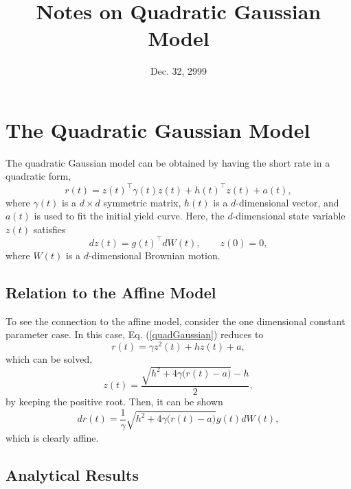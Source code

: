 \documentclass[12pt]{article}
\begin{document}
\title{Notes on Quadratic Gaussian Model}
\date{Dec. 32, 2999}

\maketitle


\section{The Quadratic Gaussian Model}

  The quadratic Gaussian model can be obtained by having the short rate in a quadratic form,
  \begin{equation}
    r(t)=z(t)^{\top}\gamma(t)z(t)+h(t)^{\top}z(t)+a(t),
    \label{quadGaussian}
  \end{equation}
  where $\gamma(t)$ is a $d\times d$ symmetric matrix, $h(t)$ is a $d$-dimensional vector, and $a(t)$ is
  used to fit the initial yield curve. Here, the $d$-dimensional state variable $z(t)$ satisfies
  \begin{equation}
    dz(t)=g(t)^{\top}dW(t), \quad \quad z(0)=0,
  \end{equation}
  where $W(t)$ is a $d$-dimensional Brownian motion.

  \subsection{Relation to the Affine Model}

  To see the connection to the affine model, consider the one dimensional constant parameter case.
  In this case, Eq. (\ref{quadGaussian}) reduces to
  \begin{equation}
    r(t)=\gamma z^2(t)+hz(t)+a,
  \end{equation}
  which can be solved,
  \begin{equation}
    z(t)=\frac{\sqrt{h^2+4\gamma\big(r(t)-a\big)}-h}{2},
  \end{equation}
  by keeping the positive root. Then, it can be shown
  \begin{equation}
    dr(t)=\frac{1}{\gamma}\sqrt{h^2+4\gamma\big(r(t)-a\big)}g(t)dW(t),
  \end{equation}
  which is clearly affine.

  \subsection{Analytical Results}
\end{document}
